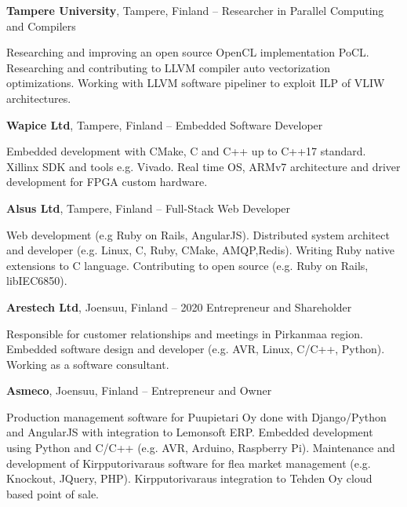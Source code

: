 \documentclass[letterpaper,MMMyyyy,nonstopmode]{simpleresumecv}
\begin{document}
\begin{Body}
\textbf{Tampere University}, Tampere, Finland
\hfill
{} --  
\Gap
\BulletItem Researcher in Parallel Computing and Compilers
\begin{Detail}
    \SubBulletItem Researching and improving an open source OpenCL
    implementation PoCL.
    \SubBulletItem Researching and contributing to LLVM compiler auto
    vectorization optimizations.
    \SubBulletItem Working with LLVM software pipeliner to exploit ILP of VLIW
    architectures.
\end{Detail}

\BigGap
\Entry
\textbf{Wapice Ltd}, Tampere, Finland
\hfill
{} -- 
\Gap
\BulletItem Embedded Software Developer
\begin{Detail}
    \SubBulletItem Embedded development with CMake, C and C++ up to C++17 standard.
    \SubBulletItem Xillinx SDK and tools e.g. Vivado.
    \SubBulletItem Real time OS, ARMv7 architecture and driver development for FPGA custom hardware.
\end{Detail}

\BigGap
\Entry
\textbf{Alsus Ltd}, Tampere, Finland
\hfill
{} -- 
\Gap
\BulletItem Full-Stack Web Developer
\begin{Detail}
    \SubBulletItem Web development (e.g Ruby on Rails, AngularJS).
    \SubBulletItem Distributed system architect and developer (e.g. Linux, C, Ruby,
    CMake, AMQP,\newline  Redis).
    \SubBulletItem Writing Ruby native extensions to C language.
    \SubBulletItem Contributing to open source (e.g. Ruby on Rails, libIEC6850).
\end{Detail}

\BigGap
\Entry
\textbf{Arestech Ltd}, Joensuu, Finland
\hfill
{} -- 2020
\Gap
\BulletItem Entrepreneur and Shareholder
\begin{Detail}
    \SubBulletItem Responsible for customer relationships and meetings in
    Pirkanmaa region.
    \SubBulletItem Embedded software design and developer (e.g. AVR, Linux,
    C/C++, Python).
    \SubBulletItem Working as a software consultant.
\end{Detail}

\BigGap
\Entry
\textbf{Asmeco}, Joensuu, Finland
\hfill
{} -- 
\Gap
\BulletItem Entrepreneur and Owner
\begin{Detail}
    \SubBulletItem Production management software for Puupietari Oy done with
    Django/Python and \newline AngularJS with integration to Lemonsoft ERP.
    \SubBulletItem Embedded development using Python and C/C++ (e.g. AVR,
    Arduino, Raspberry Pi).
    \SubBulletItem Maintenance and development of Kirpputorivaraus software for
    flea market \newline management (e.g. Knockout, JQuery, PHP).
    \SubBulletItem Kirpputorivaraus integration to Tehden Oy cloud based point
    of sale.
\end{Detail}


\end{Body}
\end{document}
